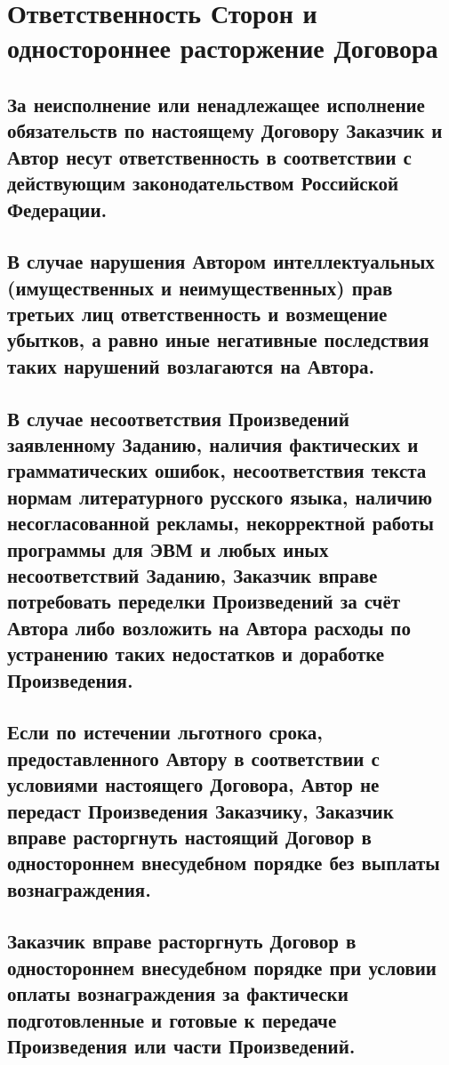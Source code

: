 \documentclass[12pt]{article}
\begin{document}
\section{Ответственность Сторон и одностороннее расторжение Договора}

\subsection{За неисполнение или ненадлежащее исполнение обязательств по настоящему Договору Заказчик и Автор несут ответственность в соответствии с действующим законодательством Российской Федерации.}

\subsection{В случае нарушения Автором интеллектуальных (имущественных и неимущественных) прав третьих лиц ответственность и возмещение убытков, а равно иные негативные последствия таких нарушений возлагаются на Автора.}

\subsection{В случае несоответствия Произведений заявленному Заданию, наличия фактических и грамматических ошибок, несоответствия текста нормам литературного русского языка, наличию несогласованной рекламы, некорректной работы программы для ЭВМ и любых иных несоответствий Заданию, Заказчик вправе потребовать переделки Произведений за счёт Автора либо возложить на Автора расходы по устранению таких недостатков и доработке Произведения.}

\subsection{Если по истечении льготного срока, предоставленного Автору в соответствии с условиями настоящего Договора, Автор не передаст Произведения Заказчику, Заказчик вправе расторгнуть настоящий Договор в одностороннем внесудебном порядке без выплаты вознаграждения.}

\subsection{Заказчик вправе расторгнуть Договор в одностороннем внесудебном порядке при условии оплаты вознаграждения за фактически подготовленные и готовые к передаче Произведения или части Произведений.}
\end{document}

